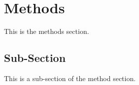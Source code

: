 
\section{Methods}
\label{sec:methods}

This is the methods section.

\subsection{Sub-Section}

This is a sub-section of the method section.
